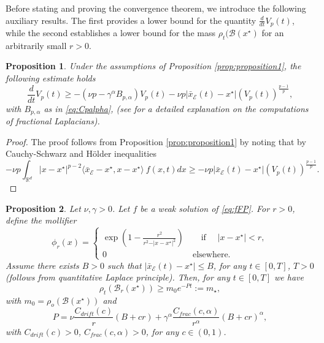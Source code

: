 \documentclass[11pt,handout]{article}%
\numberwithin{equation}{section}
\newcommand{\R}{\mathbb R}
\newtheorem{proposition}{Proposition}
\theoremstyle{definition}
\begin{document}
Before stating and proving the convergence theorem, we introduce the following auxiliary results. The first provides a lower bound for the quantity $\frac{d}{dt} V_p(t)$, while the second establishes a lower bound for the mass $\rho_t(\mathcal{B}(x^\star)$ for an arbitrarily small $r>0$.  
\begin{proposition}\label{prop:proposition2} 
	Under the assumptions of Proposition \ref{prop:proposition1}, the following estimate holds
	\begin{equation}\label{eq:lower_bound_Vp}
		\frac{d}{dt}V_p(t) \geq -(\nu p -\gamma^\alpha B_{p,\alpha}) V_p(t) - \nu p \vert \bar{x}_\mathcal{E}(t)-x^\star \vert (V_p(t))^{\frac{p-1}{p}},
	\end{equation}
	with $B_{p,\alpha}$ as in \eqref{eq:Cpalpha}, (see \cite{abatangelo2025gentle} for a detailed explanation on the computations of fractional Laplacians).
\end{proposition}
\begin{proof}
	The proof follows from Proposition \ref{prop:proposition1} by noting that by Cauchy-Schwarz and H{\"o}lder inequalities
	\begin{equation*}
		-\nu p \int_{\R^d} \vert x-x^\star \vert^{p-2} \langle \bar{x}_\mathcal{E}-x^\star, x-x^\star\rangle ~ f(x,t)dx \geq - \nu p \vert \bar{x}_\mathcal{E}(t)-x^\star \vert (V_p(t))^{\frac{p-1}{p}}.
	\end{equation*}
\end{proof}
\begin{proposition}\label{prop:mass_bounds}
	Let $\nu,\gamma>0$. Let $f$ be a weak solution of \eqref{eq:fFP}. For $r>0$, define the mollifier
	\begin{equation}\label{eq:mollifier}
		\phi_r(x) = \begin{cases}
			\exp \left( 1- \frac{r^2}{r^2 - \vert x-x^\star\vert^2} \right)  \qquad \text{if } \quad \vert x-x^\star \vert < r,\\
			0  \qquad  \qquad \qquad \qquad \qquad  \text{elsewhere}.
		\end{cases}
	\end{equation}
	Assume there exists $B>0$ such that $
	\vert \bar{x}_\mathcal{E}(t) - x^\star \vert \leq B$,
	for any $t \in [0,T]$, $T>0$ (follows from quantitative Laplace principle). Then, for any $t\in[0,T]$ we have 
	\begin{equation}\label{eq:mass_bound}
		\rho_t(\mathcal{B}_r(x^\star)) \geq  m_0 e^{-P t}:= m_\star , 
	\end{equation}
	with $m_0 = \rho_o(\mathcal{B}(x^\star))$ and 
	\begin{equation*}
		P = \nu \frac{C_{drift}(c)}{r} (B+cr) + \gamma^\alpha\frac{C_{frac}(c,\alpha)}{r^\alpha} (B+cr)^\alpha,
	\end{equation*}
	with $C_{drift}(c)>0$, $ C_{frac}(c,\alpha)>0$, for any $c\in (0,1)$.  
\end{proposition}
\end{document}
